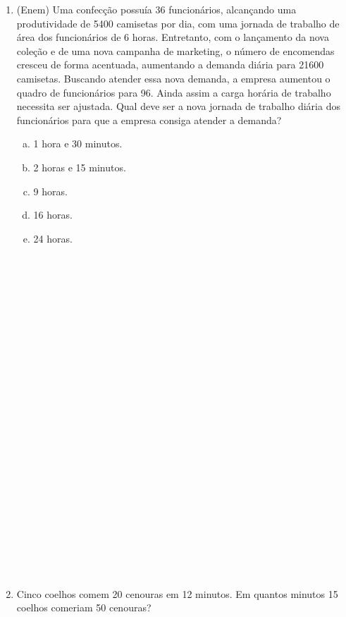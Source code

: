 \documentclass[a4paper,14pt]{article}
\begin{document}
	
	\begin{multicols}{2}
		\begin{enumerate}
			\item (Enem) Uma confecção possuía 36 funcionários, alcançando uma produtividade de 5400 camisetas por dia, com uma jornada de trabalho de área dos funcionários de 6 horas. Entretanto, com o lançamento da nova coleção e de uma nova campanha de marketing, o número de encomendas cresceu de forma acentuada, aumentando a demanda diária para 21600 camisetas. Buscando atender essa nova demanda, a empresa aumentou o quadro de funcionários para 96. Ainda assim a carga horária de trabalho necessita ser ajustada. Qual deve ser a nova jornada de trabalho diária dos funcionários para que a empresa consiga atender a demanda?
			\begin{enumerate}[a)]
				\item 1 hora e 30 minutos.
				\item 2 horas e 15 minutos.
				\item 9 horas.
				\item 16 horas.
				\item 24 horas. \\\\\\\\\\\\\\\\\\\\\\\\\\\\\\\\\\\\\\\\\\\\\\\\\\
			\end{enumerate}
		    \item Cinco coelhos comem 20 cenouras em 12 minutos. Em quantos minutos 15 coelhos comeriam 50 cenouras? \\\\\\\\\\\\\\\\\\\\\\\\\\\\
		    

\end{enumerate}
\end{multicols}
\end{document}
